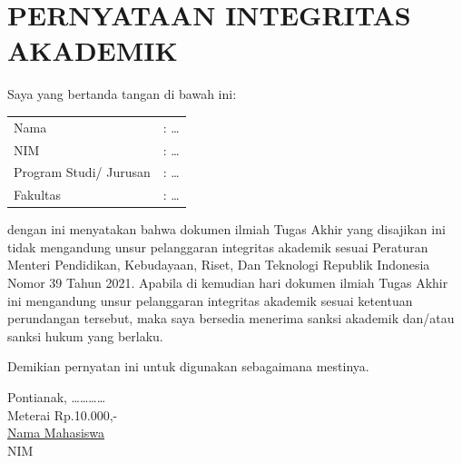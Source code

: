 \chapter*{PERNYATAAN INTEGRITAS AKADEMIK}
\thispagestyle{empty}
\noindent Saya yang bertanda tangan di bawah ini: \\
\begin{tabular}{@{}ll}
Nama & : \dots \\
NIM & : \dots \\
Program Studi/ Jurusan & : \dots \\
Fakultas & : \dots \\
\end{tabular}

\vspace{0.5cm}
\noindent dengan ini menyatakan bahwa dokumen ilmiah Tugas Akhir yang disajikan ini tidak mengandung unsur pelanggaran integritas akademik sesuai Peraturan Menteri Pendidikan, Kebudayaan, Riset, Dan Teknologi Republik Indonesia Nomor 39 Tahun 2021. Apabila di kemudian hari dokumen ilmiah Tugas Akhir ini mengandung unsur pelanggaran integritas akademik sesuai ketentuan perundangan tersebut, maka saya bersedia menerima sanksi akademik dan/atau sanksi hukum yang berlaku.

\vspace{0.5cm}
\noindent Demikian pernyatan ini untuk digunakan sebagaimana mestinya.

\vspace{1cm}
\begin{flushright}
\begin{minipage}{5cm}
\begin{singlespace}
Pontianak, \dots\dots\dots\dots \\[1.5cm]
Meterai Rp.10.000,- \\
\underline{Nama Mahasiswa} \\
NIM
\end{singlespace}
\end{minipage}
\end{flushright}

